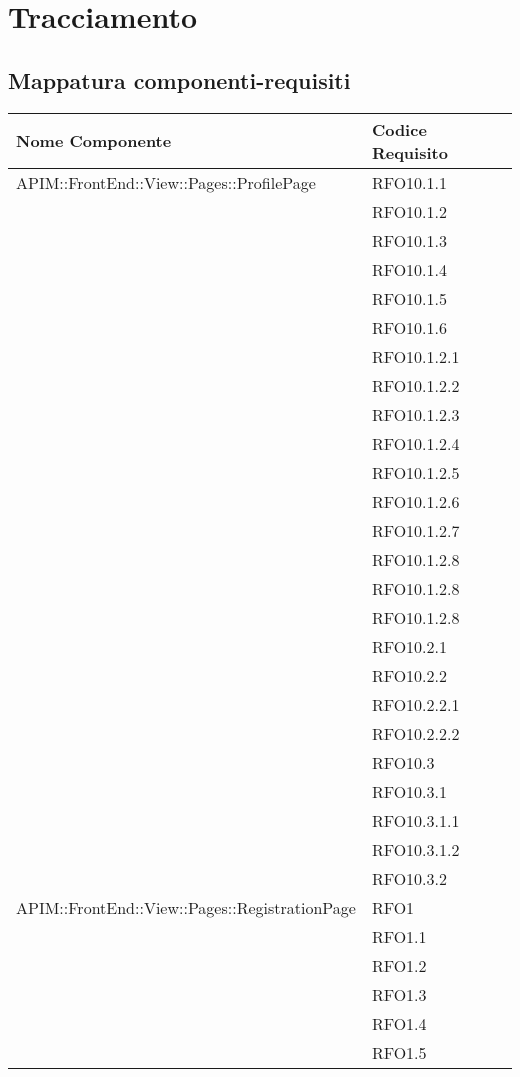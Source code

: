 \newpage
\renewcommand*{\arraystretch}{1.6}

\section{Tracciamento}
\subsection{Mappatura componenti-requisiti}



		\begin{longtable}{ p{12cm} | p{4cm} }
			\hline
			\textbf{Nome Componente} & \textbf{Codice Requisito} \\
			\hline
			APIM::FrontEnd::View::Pages::ProfilePage
			& RFO10.1.1 \\
			& RFO10.1.2 \\
			& RFO10.1.3 \\
			& RFO10.1.4 \\
			& RFO10.1.5 \\
			& RFO10.1.6 \\
			& RFO10.1.2.1 \\
			& RFO10.1.2.2 \\
			& RFO10.1.2.3 \\
			& RFO10.1.2.4 \\
			& RFO10.1.2.5 \\
			& RFO10.1.2.6 \\
			& RFO10.1.2.7 \\
			& RFO10.1.2.8 \\
			& RFO10.1.2.8 \\
			& RFO10.1.2.8 \\
			&RFO10.2.1 \\
			&RFO10.2.2 \\
			&RFO10.2.2.1 \\
			&RFO10.2.2.2 \\
			&RFO10.3 \\
			&RFO10.3.1 \\
			&RFO10.3.1.1 \\
			&RFO10.3.1.2 \\
			&RFO10.3.2 \\
			\hline
			APIM::FrontEnd::View::Pages::RegistrationPage
			&RFO1 \\
			&RFO1.1 \\
			&RFO1.2 \\
			&RFO1.3 \\
			&RFO1.4 \\
			&RFO1.5 \\

\end{longtable}
